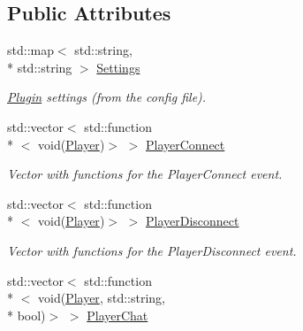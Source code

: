 \subsection*{Public Attributes}
\begin{DoxyCompactItemize}
\item 
\hypertarget{classPlugin_a3ebbb5535520c01fb815ba2f1a7a14e3}{std\-::map$<$ std\-::string, \\*
std\-::string $>$ \hyperlink{classPlugin_a3ebbb5535520c01fb815ba2f1a7a14e3}{Settings}}\label{classPlugin_a3ebbb5535520c01fb815ba2f1a7a14e3}

\begin{DoxyCompactList}\small\item\em \hyperlink{classPlugin}{Plugin} settings (from the config file). \end{DoxyCompactList}\item 
\hypertarget{classPlugin_a02e032f548c5a002496ab6b02788342b}{std\-::vector$<$ std\-::function\\*
$<$ void(\hyperlink{structPlayer}{Player})$>$ $>$ \hyperlink{classPlugin_a02e032f548c5a002496ab6b02788342b}{Player\-Connect}}\label{classPlugin_a02e032f548c5a002496ab6b02788342b}

\begin{DoxyCompactList}\small\item\em Vector with functions for the Player\-Connect event. \end{DoxyCompactList}\item 
\hypertarget{classPlugin_a3c8dec90190a888e951268b3727b7573}{std\-::vector$<$ std\-::function\\*
$<$ void(\hyperlink{structPlayer}{Player})$>$ $>$ \hyperlink{classPlugin_a3c8dec90190a888e951268b3727b7573}{Player\-Disconnect}}\label{classPlugin_a3c8dec90190a888e951268b3727b7573}

\begin{DoxyCompactList}\small\item\em Vector with functions for the Player\-Disconnect event. \end{DoxyCompactList}\item 
\hypertarget{classPlugin_a17096b73a575eef7c4e8c5380c08f670}{std\-::vector$<$ std\-::function\\*
$<$ void(\hyperlink{structPlayer}{Player}, std\-::string, \\*
bool)$>$ $>$ \hyperlink{classPlugin_a17096b73a575eef7c4e8c5380c08f670}{Player\-Chat}}\label{classPlugin_a17096b73a575eef7c4e8c5380c08f670}


\end{DoxyCompactItemize}
